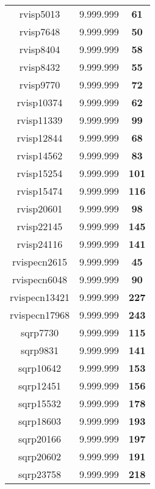 \begin{tabular}{cc||c}
rvisp5013        & 9.999.999        & {\bf 61}        \\ 
rvisp7648        & 9.999.999        & {\bf 50}        \\ 
rvisp8404        & 9.999.999        & {\bf 58}        \\ 
rvisp8432        & 9.999.999        & {\bf 55}        \\ 
rvisp9770        & 9.999.999        & {\bf 72}        \\ 
rvisp10374       & 9.999.999        & {\bf 62}        \\ 
rvisp11339       & 9.999.999        & {\bf 99}        \\ 
rvisp12844       & 9.999.999        & {\bf 68}        \\ 
rvisp14562       & 9.999.999        & {\bf 83}        \\ 
rvisp15254       & 9.999.999        & {\bf 101}       \\ 
rvisp15474       & 9.999.999        & {\bf 116}       \\ 
rvisp20601       & 9.999.999        & {\bf 98}        \\ 
rvisp22145       & 9.999.999        & {\bf 145}       \\ 
rvisp24116       & 9.999.999        & {\bf 141}       \\ 
rvispecn2615     & 9.999.999        & {\bf 45}        \\ 
rvispecn6048     & 9.999.999        & {\bf 90}        \\ 
rvispecn13421    & 9.999.999        & {\bf 227}       \\ 
rvispecn17968    & 9.999.999        & {\bf 243}       \\ 
sqrp7730         & 9.999.999        & {\bf 115}       \\ 
sqrp9831         & 9.999.999        & {\bf 141}       \\ 
sqrp10642        & 9.999.999        & {\bf 153}       \\ 
sqrp12451        & 9.999.999        & {\bf 156}       \\ 
sqrp15532        & 9.999.999        & {\bf 178}       \\ 
sqrp18603        & 9.999.999        & {\bf 193}       \\ 
sqrp20166        & 9.999.999        & {\bf 197}       \\ 
sqrp20602        & 9.999.999        & {\bf 191}       \\ 
sqrp23758        & 9.999.999        & {\bf 218}       \\ 

\end{tabular}
